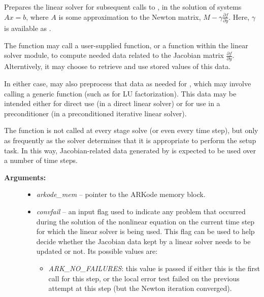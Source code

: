 \documentclass[letterpaper,10pt,english]{sphinxmanual}
\begin{document}
\begin{fulllineitems}
\label{linear_solvers/custom:c.lsetup}
Prepares the linear solver for subsequent calls to
{\hyperref[linear_solvers/custom:c.lsolve]{\emph{}}}, in the solution of systems \(A x = b\),
where \(A\) is some approximation to the Newton matrix,
\(M-\gamma \frac{\partial f}{\partial y}\).  Here,
\(\gamma\) is available as .

The {\hyperref[linear_solvers/custom:c.lsetup]{\emph{}}} function may call a user-supplied function,
or a function within the linear solver module, to compute needed
data related to the Jacobian matrix \(\frac{\partial
f}{\partial y}\).  Alterntively, it may choose to retrieve and use
stored values of this data.

In either case, {\hyperref[linear_solvers/custom:c.lsetup]{\emph{}}} may also preprocess that data as
needed for {\hyperref[linear_solvers/custom:c.lsolve]{\emph{}}}, which may involve calling a generic
function (such as for LU factorization).  This data may be intended
either for direct use (in a direct linear solver) or for use in a
preconditioner (in a preconditioned iterative linear solver).

The {\hyperref[linear_solvers/custom:c.lsetup]{\emph{}}} function is not called at every stage solve
(or even every time step), but only as frequently as the solver
determines that it is appropriate to perform the setup task.  In
this way, Jacobian-related data generated by {\hyperref[linear_solvers/custom:c.lsetup]{\emph{}}} is
expected to be used over a number of time steps.
\begin{description}
\item[{\textbf{Arguments:}}] \leavevmode\begin{itemize}
\item {} 
\emph{arkode\_mem} -- pointer to the ARKode memory block.

\item {} 
\emph{convfail} -- an input flag used to indicate any problem that
occurred during the solution of the nonlinear equation on the
current time step for which the linear solver is being
used. This flag can be used to help decide whether the
Jacobian data kept by a linear solver needs to be
updated or not. Its possible values are:
\begin{itemize}
\item {} 
\emph{ARK\_NO\_FAILURES}: this value is passed if either this is the
first call for this step, or the local error test failed on
the previous attempt at this step (but the Newton iteration
converged).


\end{itemize}
\end{itemize}
\end{description}
\end{fulllineitems}
\end{document}
